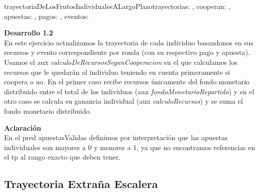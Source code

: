 \documentclass[10pt,a4paper]{article}
\begin{document}
\begin{proc}{trayectoriaDeLosFrutosIndividualesALargoPlazo}{\Inout trayectorias: \TLista{\TLista{\float}}, \In cooperan: \TLista{\bool}, \In apuestas:
\TLista{\TLista{\float}}, \In pagos: \TLista{\TLista{\float}}, \In eventos: \TLista{\TLista{\nat}}}{}
    
\textbf{Desarrollo 1.2} \\
En este ejercicio actualizamos la trayectoria de cada individuo basandonos en sus recursos y evento correspondiente por ronda (con su respectivo pago y apuesta). Usamos el aux \textit{calculoDeRecursosSegunCooperacion} en el que calculamos los recursos que le quedarán al individuo teniendo en cuenta primeramente si coopera o no. En el primer caso recibe recursos únicamente del fondo monetario distribuido entre el total de los individuos (aux \textit{fondoMonetarioRepartido}) y en el otro caso se calcula su ganancia individual (aux \textit{calculoRecursos}) y se suma el fondo monetario distribuido.

\textbf{Aclaración} \\
En el pred apuestasValidas definimos por interpretación que las apuestas individuales son mayores a 0 y menores a 1, ya que no encontramos referencias en el tp al rango exacto que deben tener.

\end{proc}



\subsection{Trayectoria Extraña Escalera}
\end{document}
